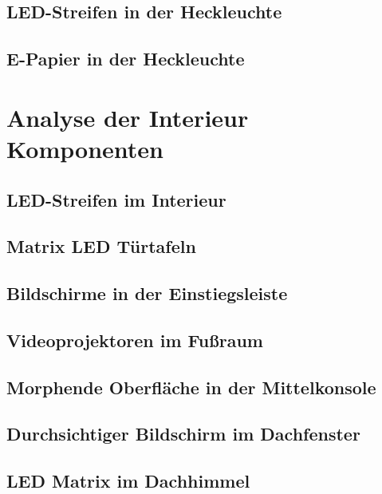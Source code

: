 \subsection{LED-Streifen in der Heckleuchte}
\subsection{E-Papier in der Heckleuchte}


\section{Analyse der Interieur Komponenten}
\subsection{LED-Streifen im Interieur}
\subsection{Matrix LED Türtafeln}
\subsection{Bildschirme in der Einstiegsleiste}
\subsection{Videoprojektoren im Fußraum}
\subsection{Morphende Oberfläche in der Mittelkonsole}
\subsection{Durchsichtiger Bildschirm im Dachfenster}
\subsection{LED Matrix im Dachhimmel}